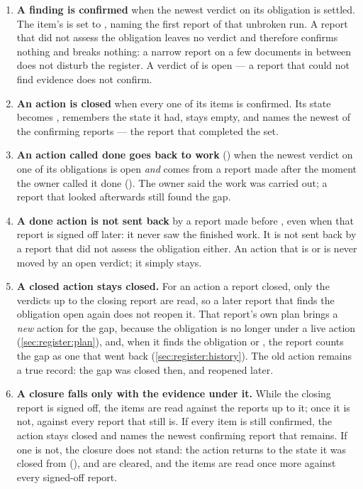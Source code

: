 \begin{enumerate}
  \item \textbf{A finding is confirmed} when the newest verdict on its obligation is settled.
    The item's  is set to , naming the first report of
    that unbroken run. A report that did not assess the obligation leaves no verdict and
    therefore confirms nothing and breaks nothing: a narrow report on a few documents in
    between does not disturb the register. A verdict of  is open --- a report
    that could not find evidence does not confirm.
  \item \textbf{An action is closed} when every one of its items is confirmed. Its state
    becomes ,  remembers the state it had, 
    stays empty, and  names the newest of the confirming reports ---
    the report that completed the set.
  \item \textbf{An action called done goes back to work} () when the newest
    verdict on one of its obligations is open \emph{and} comes from a report made after the
    moment the owner called it done (). The owner said the work was carried out;
    a report that looked afterwards still found the gap.
  \item \textbf{A done action is not sent back} by a report made before , even
    when that report is signed off later: it never saw the finished work. It is not sent back
    by a report that did not assess the obligation either. An action that is  or
     is never moved by an open verdict; it simply stays.
  \item \textbf{A closed action stays closed.} For an action a report closed, only the
    verdicts up to the closing report are read, so a later report that finds the obligation
    open again does not reopen it. That report's own plan brings a \emph{new} action for the
    gap, because the obligation is no longer under a live action
    (\cref{sec:register:plan}), and, when it finds the obligation  or
    , the report counts the gap as one that went back
    (\cref{sec:register:history}). The old action remains a true record: the gap was closed
    then, and reopened later.
  \item \textbf{A closure falls only with the evidence under it.} While the closing report is
    signed off, the items are read against the reports up to it; once it is not, against every
    report that still is. If every item is still confirmed, the action stays closed and
     names the newest confirming report that remains. If one is not,
    the closure does not stand: the action returns to the state it was closed from
    (),  and  are cleared, and the
    items are read once more against every signed-off report.
\end{enumerate}

